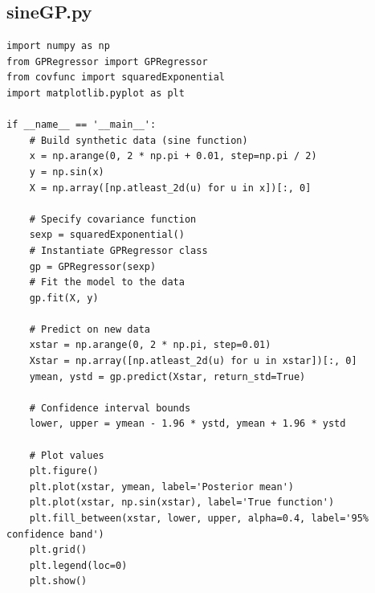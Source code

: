 \documentclass[10pt,a4paper,twoside]{book}
\begin{document}
\subsection*{sineGP.py}
\label{sineGP}
\begin{verbatim}
import numpy as np
from GPRegressor import GPRegressor
from covfunc import squaredExponential
import matplotlib.pyplot as plt

if __name__ == '__main__':
    # Build synthetic data (sine function)
    x = np.arange(0, 2 * np.pi + 0.01, step=np.pi / 2)
    y = np.sin(x)
    X = np.array([np.atleast_2d(u) for u in x])[:, 0]

    # Specify covariance function
    sexp = squaredExponential()
    # Instantiate GPRegressor class
    gp = GPRegressor(sexp)
    # Fit the model to the data
    gp.fit(X, y)

    # Predict on new data
    xstar = np.arange(0, 2 * np.pi, step=0.01)
    Xstar = np.array([np.atleast_2d(u) for u in xstar])[:, 0]
    ymean, ystd = gp.predict(Xstar, return_std=True)

    # Confidence interval bounds
    lower, upper = ymean - 1.96 * ystd, ymean + 1.96 * ystd

    # Plot values
    plt.figure()
    plt.plot(xstar, ymean, label='Posterior mean')
    plt.plot(xstar, np.sin(xstar), label='True function')
    plt.fill_between(xstar, lower, upper, alpha=0.4, label='95% confidence band')
    plt.grid()
    plt.legend(loc=0)
    plt.show()
   \end{verbatim}
\end{document}
